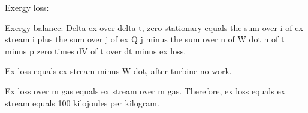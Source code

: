 Exergy loss:  

Exergy balance:  
Delta ex over delta t, zero stationary equals the sum over i of ex stream i plus the sum over j of ex Q j minus the sum over n of W dot n of t minus p zero times dV of t over dt minus ex loss.  

Ex loss equals ex stream minus W dot, after turbine no work.  

Ex loss over m gas equals ex stream over m gas. Therefore, ex loss equals ex stream equals 100 kilojoules per kilogram.